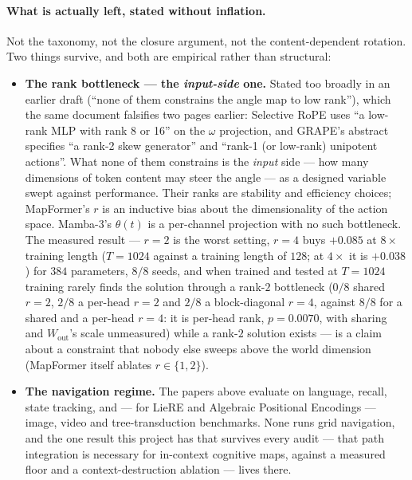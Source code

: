 \documentclass[11pt]{article}
\begin{document}
\paragraph{What is actually left, stated without inflation.} Not the taxonomy,
not the closure argument, not the content-dependent rotation. Two things survive,
and both are empirical rather than structural:
\begin{itemize}\itemsep2pt
\item \textbf{The rank bottleneck --- the \emph{input-side} one.} Stated too
  broadly in an earlier draft (``none of them constrains the angle map to low
  rank''), which the same document falsifies two pages earlier: Selective RoPE uses
  ``a low-rank MLP with rank 8 or 16'' on the $\omega$ projection, and GRAPE's
  abstract specifies ``a rank-2 skew generator'' and ``rank-1 (or low-rank)
  unipotent actions''. What none of them constrains is the \emph{input} side --- how
  many dimensions of token content may steer the angle --- as a designed variable
  swept against performance. Their ranks are stability and efficiency choices;
  MapFormer's $r$ is an inductive bias about the dimensionality of the action space.
  Mamba-3's $\theta(t)$ is a per-channel projection with no such bottleneck. The measured result --- $r=2$ is the worst setting, $r=4$ buys
  $+0.085$ at $8\times$ training length ($T=1024$ against a training length of $128$;
  at $4\times$ it is $+0.038$) for $384$ parameters, $8/8$ seeds, and when trained and tested at
  $T=1024$ training rarely finds the solution through a rank-$2$ bottleneck
  ($0/8$ shared $r=2$, $2/8$ a per-head $r=2$ and $2/8$ a block-diagonal $r=4$, against
  $8/8$ for a shared and a per-head $r=4$: it is per-head rank, $p=0.0070$, with sharing and
  $W_{\mathrm{out}}$'s scale unmeasured) while a rank-$2$
  solution exists --- is a claim about a constraint that nobody else sweeps above the
  world dimension (MapFormer itself ablates $r\in\{1,2\}$).
\item \textbf{The navigation regime.} The papers above evaluate on language,
  recall, state tracking, and --- for LieRE and Algebraic Positional Encodings ---
  image, video and tree-transduction benchmarks. None runs grid navigation, and the one result this
  project has that survives every audit --- that path integration is necessary for
  in-context cognitive maps, against a measured floor and a context-destruction ablation ---
  lives there.


\end{itemize}
\end{document}
